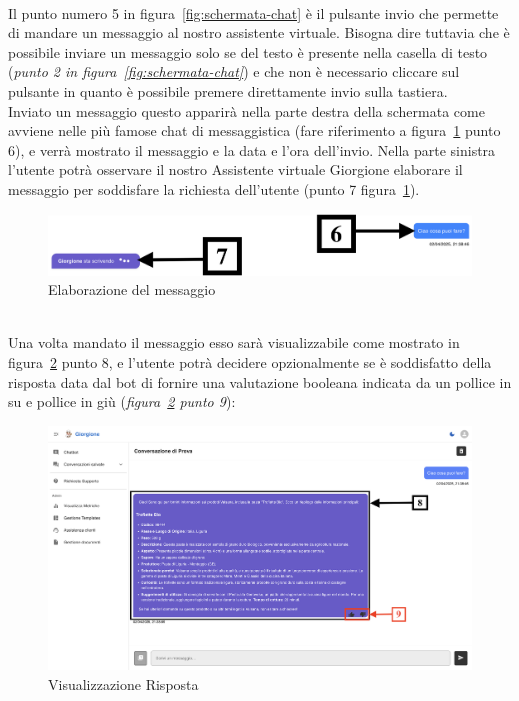 \\
Il punto numero 5 in figura~\ref{fig:schermata-chat} è il pulsante invio che permette di mandare un messaggio al nostro assistente virtuale. Bisogna dire tuttavia che è possibile inviare un messaggio solo se del testo è presente nella casella di testo (\textit{punto 2 in figura~\ref{fig:schermata-chat}}) e che non è necessario cliccare sul pulsante in quanto è possibile premere direttamente invio sulla tastiera.
\\
Inviato un messaggio questo apparirà nella parte destra della schermata come avviene nelle più famose chat di messaggistica (fare riferimento a figura~\ref{fig:Elaborazione} punto 6), e verrà mostrato il messaggio e la data e l'ora dell'invio.
Nella parte sinistra l'utente potrà osservare il nostro Assistente virtuale Giorgione elaborare il messaggio per soddisfare la richiesta dell'utente (punto 7 figura~\ref{fig:Elaborazione}).
\begin{figure}[h!]
    \centering
    \includegraphics[width=\textwidth]{./img/SchermataChat2.png}
    \caption{Elaborazione del messaggio}
    \label{fig:Elaborazione}
\end{figure}
\\
Una volta mandato il messaggio esso sarà visualizzabile come mostrato in figura~\ref{fig:Visualizzazione Risposta} punto 8, e l'utente potrà decidere opzionalmente se è soddisfatto della risposta data dal bot di fornire una valutazione booleana indicata da un pollice in su e pollice in giù (\textit{figura~\ref{fig:Visualizzazione Risposta} punto 9}):
\begin{figure}[h!]
    \centering
    \includegraphics[width=\textwidth]{./img/SchermataChat3.png}
    \caption{Visualizzazione Risposta}
    \label{fig:Visualizzazione Risposta}
\end{figure}
